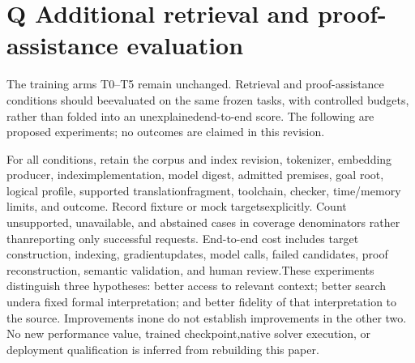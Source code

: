 \section*{Q  Additional retrieval and proof-assistance evaluation}
\noindent
The training arms T0--T5 remain unchanged. Retrieval and proof-assistance conditions should be\linebreak[4]
evaluated on the same frozen tasks, with controlled budgets, rather than folded into an unexplained\linebreak[4]
end-to-end score. The following are proposed experiments; no outcomes are claimed in this revision.\par


\noindent
For all conditions, retain the corpus and index revision, tokenizer, embedding producer, index\linebreak[4]
implementation, model digest, admitted premises, goal root, logical profile, supported translation\linebreak[4]
fragment, toolchain, checker, time/memory limits, and outcome. Record fixture or mock targets\linebreak[4]
explicitly. Count unsupported, unavailable, and abstained cases in coverage denominators rather than\linebreak[4]
reporting only successful requests. End-to-end cost includes target construction, indexing, gradient\linebreak[4]
updates, model calls, failed candidates, proof reconstruction, semantic validation, and human review.\linebreak[4]
These experiments distinguish three hypotheses: better access to relevant context; better search under\linebreak[4]
a fixed formal interpretation; and better fidelity of that interpretation to the source. Improvements in\linebreak[4]
one do not establish improvements in the other two. No new performance value, trained checkpoint,\linebreak[4]
native solver execution, or deployment qualification is inferred from rebuilding this paper.\par

